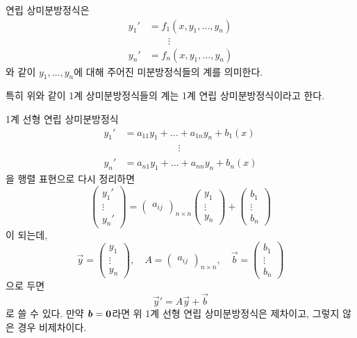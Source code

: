 \documentclass[../engineering_mathematics_lecture_note.tex]{subfiles}
\begin{document}
\begin{definition}
    연립 상미분방정식은
    \begin{align*}
        y_1' &= f_1 (x, y_1, \dots, y_n)\\
             &\qquad\vdots \\
        y_n' &= f_n (x, y_1, \dots, y_n)
    \end{align*}
    와 같이 $y_1, \dots, y_n$에 대해 주어진 미분방정식들의 계를 의미한다.
    
    특히 위와 같이 1계 상미분방정식들의 계는 1계 연립 상미분방정식이라고 한다.
\end{definition}

\begin{example}
    1계 선형 연립 상미분방정식
    \begin{align*}
        y_1' &= a_{11} y_1 + \dots + a_{1n} y_n + b_1(x)\\
             &\phantom{= a_{11} y_1 + \dots} \vdots\\
        y_n' &= a_{n1} y_1 + \dots + a_{nn} y_n + b_n(x)
    \end{align*}
    을 행렬 표현으로 다시 정리하면
    \begin{equation*}
        \begin{pmatrix}
            y_1' \\ \vdots \\ y_n'
        \end{pmatrix}
        = \begin{pmatrix}
            a_{ij}
        \end{pmatrix}_{n \times n}
        \begin{pmatrix}
            y_1 \\ \vdots \\ y_n
        \end{pmatrix}
        + \begin{pmatrix}
            b_1 \\ \vdots \\ b_n
        \end{pmatrix}
    \end{equation*}
    이 되는데,
    \begin{equation*}
        \vec y =
        \begin{pmatrix}
            y_1 \\ \vdots \\ y_n
        \end{pmatrix}, \quad
        A = \begin{pmatrix}
            a_{ij}
        \end{pmatrix}_{n \times n}, \quad
        \vec b =
        \begin{pmatrix}
            b_1 \\ \vdots \\ b_n
        \end{pmatrix}
    \end{equation*}
    으로 두면
    \begin{equation*}
        \vec y' = A \vec y + \vec b
    \end{equation*}
    로 쓸 수 있다.
    만약 $\bm{\mathit{b}} = \bm{\mathrm{0}}$라면 위 1계 선형 연립 상미분방정식은 제차이고, 그렇지 않은 경우 비제차이다.
\end{example}
\end{document}

